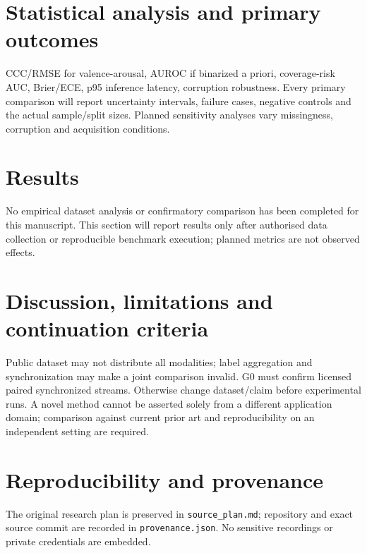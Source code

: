 \documentclass[11pt,a4paper]{article}
\begin{document}
\section{Statistical analysis and primary outcomes}
CCC/RMSE for valence-arousal, AUROC if binarized a priori, coverage-risk AUC, Brier/ECE, p95 inference latency, corruption robustness. Every primary comparison will report uncertainty intervals, failure cases, negative controls and the actual sample/split sizes. Planned sensitivity analyses vary missingness, corruption and acquisition conditions.
\section{Results}
No empirical dataset analysis or confirmatory comparison has been completed for this manuscript. This section will report results only after authorised data collection or reproducible benchmark execution; planned metrics are not observed effects.
\section{Discussion, limitations and continuation criteria}
Public dataset may not distribute all modalities; label aggregation and synchronization may make a joint comparison invalid. G0 must confirm licensed paired synchronized streams. Otherwise change dataset/claim before experimental runs. A novel method cannot be asserted solely from a different application domain; comparison against current prior art and reproducibility on an independent setting are required.
\section{Reproducibility and provenance}
The original research plan is preserved in \texttt{source\_plan.md}; repository and exact source commit are recorded in \texttt{provenance.json}. No sensitive recordings or private credentials are embedded.
\end{document}
